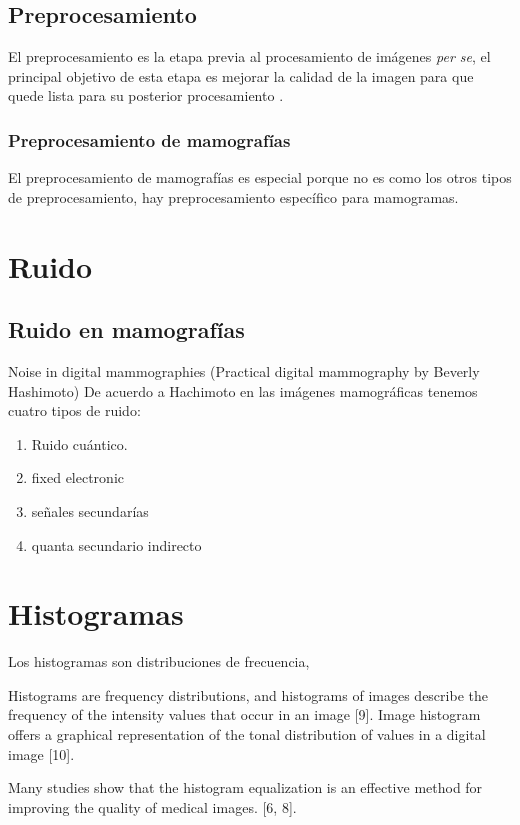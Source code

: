 \subsection{Preprocesamiento}
El preprocesamiento es la etapa previa al procesamiento de imágenes \textit{per
se}, el principal objetivo de esta etapa es mejorar la calidad de la imagen
para que quede lista para su posterior procesamiento \cite{ponraj2011survey}.

\subsubsection{Preprocesamiento de mamografías}
El preprocesamiento de mamografías es especial porque no es como los otros tipos
de preprocesamiento, hay preprocesamiento específico para mamogramas.

\section{Ruido}

\subsection{Ruido en mamografías}
Noise in digital mammographies (Practical digital mammography by Beverly
Hashimoto) De acuerdo a Hachimoto en las imágenes mamográficas tenemos cuatro
tipos de ruido:

\begin{enumerate}
    \item Ruido cuántico.
    \item fixed electronic
    \item señales secundarías
    \item quanta secundario indirecto
\end{enumerate}

\section{Histogramas}
Los histogramas son distribuciones de frecuencia, 

Histograms are frequency distributions, and histograms of images describe the
frequency of the intensity values that occur in an image [9]. Image histogram
offers a graphical representation of the tonal distribution of values in a
digital image [10].


Many studies show that the histogram equalization is an effective method for
improving the quality of medical images. [6, 8]. 

